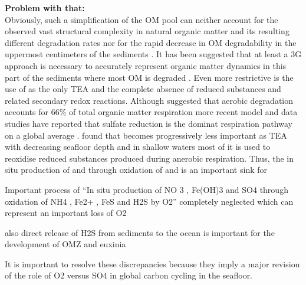 \documentclass[gmd, manuscript]{copernicus}
\begin{document}

\textbf{Problem with that:} \\
Obviously, such a simplification of the OM pool can neither account for the observed vast structural complexity in natural organic matter and its resulting different degradation 
rates nor for the rapid decrease in OM degradability in the uppermost centimeters of the sediments \citep{arndt_quantifying_2013}. It has been suggested that at least a 3G approach 
is necessary to accurately represent organic matter dynamics in this part of the sediments where most OM is degraded \citep[e.g.][]{soetaert_model_1996}. 
Even more restrictive is the use of  as the only TEA and the complete absence of reduced substances and related secondary redox reactions. 
Although \citet{archer_model_2002} suggested that aerobic degradation accounts for 66\% of total organic matter respiration 
more recent model and data studies have reported that sulfate reduction is the dominat respiration pathway on a global average 
\citep[with contributions of 55-76\%][]{canfield_aquatic_2005, jorgensen_sulfur_2006, thullner_global_scale_2009}. \citet{thullner_global_scale_2009} found that  becomes 
progressively less important as TEA with decreasing seafloor depth and in shallow waters most of it is used to reoxidise reduced substances produced during anerobic respiration. 
Thus, the in situ production of  and  through oxidation of  and  is an important sink for  

Important process of ``In situ production of NO 3 , Fe(OH)3 and SO4 through oxidation of NH4 , Fe2+ , FeS and H2S by O2'' completely neglected which can represent an important loss 
of O2

also direct release of H2S from sediments to the ocean is important for the development of OMZ and euxinia


It is important to resolve these discrepancies because they imply a major revision of the role of O2 versus SO4 in global carbon cycling in the seafloor. 
\end{document}
